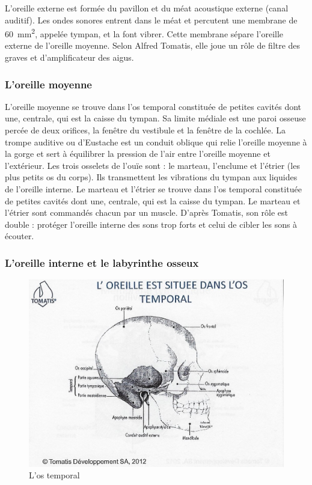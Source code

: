L'oreille externe\autocite[ch. 8, pp. 319--321.]{marieb:biologie}
est formée du pavillon et du méat acoustique externe
	(canal auditif). Les ondes sonores entrent dans le méat et percutent
	une membrane de \SI{60}{\milli\metre\squared}, appelée tympan, et la font vibrer. 
	Cette membrane
	sépare l'oreille externe de l'oreille moyenne. 
	Selon Alfred Tomatis,
	elle joue un rôle de filtre des graves et d'amplificateur des aigus.




\subsubsection{L'oreille moyenne}

L'oreille moyenne se trouve dans l'os temporal constituée de petites
cavités dont une, centrale, qui est la caisse du tympan. Sa limite
médiale est une paroi osseuse percée de deux orifices, la fenêtre
du vestibule et la fenêtre de la cochlée. La trompe auditive ou d'Eustache
est un conduit oblique qui relie l'oreille moyenne à la gorge et sert
à équilibrer la pression de l'air entre l'oreille moyenne et l'extérieur.
Les trois osselets de l'ouïe sont : le marteau, l'enclume et l'étrier
(les plus petits os du corps). Ils transmettent les vibrations du
tympan aux liquides de l'oreille interne. Le marteau et l'étrier se
trouve dans l'os temporal constituée de petites cavités dont une,
centrale, qui est la caisse du tympan. 
Le marteau et l'étrier sont commandés chacun par un muscle. D'après
Tomatis, son rôle est double : protéger l'oreille interne des sons
trop forts et celui de cibler les sons à écouter.

\subsubsection{L'oreille interne et le labyrinthe osseux}

\begin{figure}
	\centering
	\includegraphics[width=0.7\linewidth]{images/Loreilleostemporal_crane.jpg}
	\caption[L'os temporal]{L'os temporal}
	\label{fig:loreilleostemporal18}
\end{figure}

